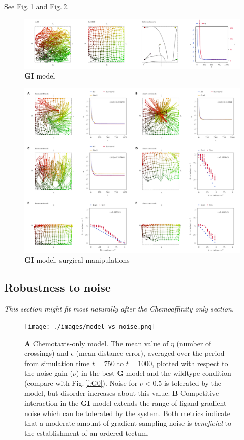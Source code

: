 \documentclass[11pt, a4paper, draft]{article}
\begin{document}
See Fig.\,\ref{f:GI} and Fig.\,\ref{f:GIsurg}.

\begin{figure}
\includegraphics[width=\linewidth]{./images/j4_ee_GI_best_1_wt_figcomp2_exit_true.png}
\caption{$\mathbf{GI}$ model}
\label{f:GI}
\end{figure}

\begin{figure}
\includegraphics[width=\linewidth]{./images/fig_GI_surgical.png}
\caption{$\mathbf{GI}$ model, surgical manipulations}
\label{f:GIsurg}
\end{figure}

\subsection*{Robustness to noise}

\emph{This section might fit most naturally after the Chemoaffinity only section.}

\begin{figure}
\centering
\texttt{[image: ./images/model\_vs\_noise.png]}
\caption{ \textbf{A} Chemotaxis-only model. The mean value of $\eta$ (number of crossings) and $\epsilon$
(mean distance error), averaged over the period from simulation time $t=750$ to $t=1000$, plotted with respect to the
noise gain ($\nu$) in the best $\mathbf{G}$ model and the wildtype condition (compare with
Fig.\,\ref{f:G0}). Noise for $\nu < 0.5$ is tolerated by the model, but
disorder increases about this value.
\textbf{B} Competitive interaction in the $\mathbf{GI}$ model extends the
range of ligand gradient noise which can be tolerated by the system.
Both metrics indicate that a moderate
amount of gradient sampling noise is \emph{beneficial} to the establishment of
an ordered tectum.}
\label{f:noise}
\end{figure}
\end{document}
